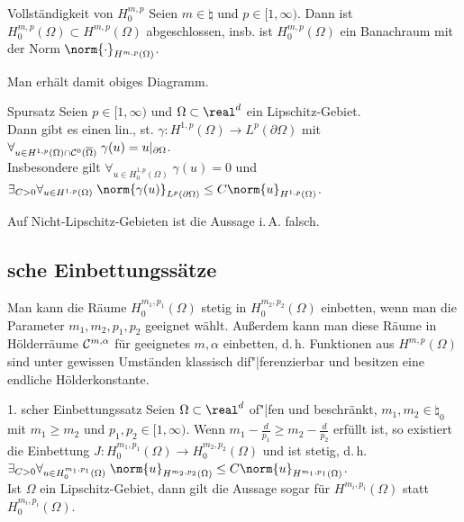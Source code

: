 \begin{Satz}{Vollständigkeit von $H^{m,p}_0$}
    Seien $m \in \natural$ und $p \in [1, \infty)$.
    Dann ist $H^{m,p}_0(\Omega) \subset H^{m,p}(\Omega)$ abgeschlossen,
    insb. ist $H^{m,p}_0(\Omega)$ ein Banachraum mit der Norm $\norm{\cdot}_{H^{m,p}(\Omega)}$.
\end{Satz}

\begin{Bem}
    Man erhält damit obiges Diagramm.
\end{Bem}

\linie

\begin{Satz}{Spursatz}
    Seien $p \in [1, \infty)$ und $\Omega \subset \real^d$ ein Lipschitz-Gebiet.\\
    Dann gibt es einen lin., st. 
    $\gamma\colon H^{1,p}(\Omega) \to L^p(\partial\Omega)$ mit
    $\forall_{u \in H^{1,p}(\Omega) \cap \mathcal{C}^0(\overline{\Omega})}\;
    \gamma(u) = u|_{\partial\Omega}$.\\
    Insbesondere gilt $\forall_{u \in H^{1,p}_0(\Omega)}\; \gamma(u) = 0$ und
    $\exists_{C > 0} \forall_{u \in H^{1,p}(\Omega)}\;
    \norm{\gamma(u)}_{L^p(\partial\Omega)} \le C \norm{u}_{H^{1,p}(\Omega)}$.
\end{Satz}

\begin{Bem}
    Auf Nicht-Lipschitz-Gebieten ist die Aussage i.\,A. falsch.
\end{Bem}

\pagebreak

\subsection{%
    sche Einbettungssätze%
}

\begin{Bem}
    Man kann die Räume $H_0^{m_1,p_1}(\Omega)$ stetig in $H_0^{m_2,p_2}(\Omega)$ einbetten,
    wenn man die Parameter $m_1, m_2, p_1, p_2$ geeignet wählt.
    Außerdem kann man diese Räume in Hölderräume $\mathcal{C}^{m,\alpha}$ für geeignetes $m, \alpha$
    einbetten,
    d.\,h. Funktionen aus $H^{m,p}(\Omega)$ sind unter gewissen Umständen klassisch
    dif"|ferenzierbar und besitzen eine endliche Hölderkonstante.
\end{Bem}

\begin{Satz}{1. scher Einbettungssatz}
    Seien $\Omega \subset \real^d$ of"|fen und beschränkt,
    $m_1, m_2 \in \natural_0$ mit $m_1 \ge m_2$ und
    $p_1, p_2 \in [1, \infty)$.
    Wenn $m_1 - \frac{d}{p_1} \ge m_2 - \frac{d}{p_2}$ erfüllt ist,
    so existiert die Einbettung $J\colon H_0^{m_1,p_1}(\Omega) \to H_0^{m_2,p_2}(\Omega)$
    und ist stetig,
    d.\,h. $\exists_{C > 0} \forall_{u \in H_0^{m_1,p_1}(\Omega)}\;
    \norm{u}_{H^{m_2,p_2}(\Omega)} \le C \norm{u}_{H^{m_1,p_1}(\Omega)}$.\\
    Ist $\Omega$ ein Lipschitz-Gebiet, dann gilt die Aussage sogar für
    $H^{m_i,p_i}(\Omega)$ statt $H_0^{m_i,p_i}(\Omega)$.
\end{Satz}

